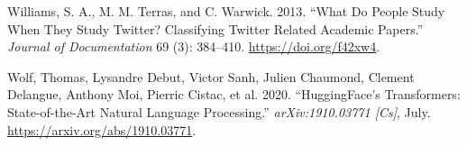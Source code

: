 \documentclass[a4paper, notitlepage]{extreport}
\newlength{\cslhangindent}
\newenvironment{CSLReferences}[2] %
 {%
  \setlength{\parindent}{0pt}
  \ifodd #1 \everypar{\setlength{\hangindent}{\cslhangindent}}\ignorespaces\fi
  \ifnum #2 > 0
  \setlength{\parskip}{#2\baselineskip}
  \fi
 }%
 {}
\begin{document}
\begin{CSLReferences}{1}{0}
\leavevmode{}%
Williams, S. A., M. M. Terras, and C. Warwick. 2013. {``What Do People
Study When They Study {Twitter}? {Classifying Twitter} Related Academic
Papers.''} \emph{Journal of Documentation} 69 (3): 384--410.
\url{https://doi.org/f42xw4}.

\leavevmode{}%
Wolf, Thomas, Lysandre Debut, Victor Sanh, Julien Chaumond, Clement
Delangue, Anthony Moi, Pierric Cistac, et al. 2020. {``{HuggingFace}'s
{Transformers}: {State}-of-the-Art {Natural Language Processing}.''}
\emph{arXiv:1910.03771 {[}Cs{]}}, July.
\url{https://arxiv.org/abs/1910.03771}.

\end{CSLReferences}


\appendix
\end{document}
